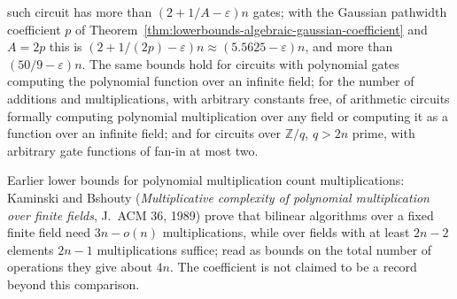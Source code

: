 \begin{theorem}
  such circuit has more than $(2+1/A-\varepsilon)n$ gates; with the Gaussian
  pathwidth coefficient $p$ of
  Theorem~\ref{thm:lowerbounds-algebraic-gaussian-coefficient} and $A=2p$
  this is $(2+1/(2p)-\varepsilon)n\approx(5.5625-\varepsilon)n$, and more than
  $(50/9-\varepsilon)n$. The same bounds hold for circuits with polynomial
  gates computing the polynomial function over an infinite field; for the
  number of additions and multiplications, with arbitrary constants free, of
  arithmetic circuits formally computing polynomial multiplication over any
  field or computing it as a function over an infinite field; and for
  circuits over $\mathbb{Z}/q$, $q>2n$ prime, with arbitrary gate functions of
  fan-in at most two.

  Earlier lower bounds for polynomial multiplication count multiplications:
  Kaminski and Bshouty (\emph{Multiplicative complexity of polynomial
  multiplication over finite fields}, J.~ACM 36, 1989) prove that bilinear
  algorithms over a fixed finite field need $3n-o(n)$ multiplications, while
  over fields with at least $2n-2$ elements $2n-1$ multiplications suffice;
  read as bounds on the total number of operations they give about $4n$. The
  coefficient is not claimed to be a record beyond this comparison.
\end{theorem}
